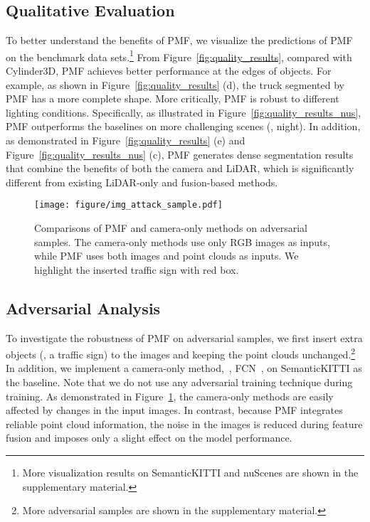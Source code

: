 \documentclass[10pt,twocolumn,letterpaper]{article}
\begin{document}
\subsection{Qualitative Evaluation}
\label{sec:qualitative_eval}
To better understand the benefits of PMF, we visualize the predictions of PMF on the benchmark data sets.\footnote{More visualization results on SemanticKITTI and nuScenes are shown in the supplementary material.} From Figure~\ref{fig:quality_results}, compared with Cylinder3D, PMF achieves better performance at the edges of objects. For example, as shown in Figure~\ref{fig:quality_results} (d), the truck segmented by PMF has a more complete shape. More critically, PMF is robust to different lighting conditions. Specifically, as illustrated in Figure~\ref{fig:quality_results_nus}, PMF outperforms the baselines on more challenging scenes (\eg, night). In addition, as demonstrated in Figure~\ref{fig:quality_results} (e) and Figure~\ref{fig:quality_results_nus} (c), PMF generates dense segmentation results that combine the benefits of both the camera and LiDAR, which is significantly different from existing LiDAR-only and fusion-based methods.

\begin{figure}
\centering
\texttt{[image: figure/img\_attack\_sample.pdf]}
\caption{Comparisons of PMF and camera-only methods on adversarial samples. The camera-only methods use only RGB images as inputs, while PMF uses both images and point clouds as inputs. We highlight the inserted traffic sign with red box.}
\label{fig:visual_anti_attack}
\end{figure}

\subsection{Adversarial Analysis}
\label{sec:abla_anti_attack}
To investigate the robustness of PMF on adversarial samples, we first insert extra objects (\eg, a traffic sign) to the images and keeping the point clouds unchanged.\footnote{More adversarial samples are shown in the supplementary material.} In addition, we implement a camera-only method,~\ie, FCN~\cite{Long2015FullyCN}, on SemanticKITTI as the baseline. Note that we do not use any adversarial training technique during training.
As demonstrated in Figure~\ref{fig:visual_anti_attack}, the camera-only methods are easily affected by changes in the input images. In contrast, because PMF integrates reliable point cloud information,
the noise in the images is reduced during feature fusion and imposes only a slight effect on the model performance.
\end{document}
